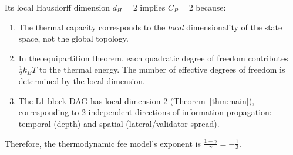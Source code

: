 \documentclass{article}
\theoremstyle{definition}
\theoremstyle{remark}
\theoremstyle{plain}
\begin{document}
Its local Hausdorff dimension $d_H = 2$ implies $C_P = 2$ because:

\begin{enumerate}
    \item The thermal capacity corresponds to the \emph{local} dimensionality of the state space, not the global topology.
    \item In the equipartition theorem, each quadratic degree of freedom contributes $\frac{1}{2}k_BT$ to the thermal energy. The number of effective degrees of freedom is determined by the local dimension.
    \item The L1 block DAG has local dimension 2 (Theorem~\ref{thm:main}), corresponding to 2 independent directions of information propagation: temporal (depth) and spatial (lateral/validator spread).
\end{enumerate}

Therefore, the thermodynamic fee model's exponent is $\frac{1-\gamma}{\gamma} = -\frac{1}{3}$.

	
	
\end{document}
